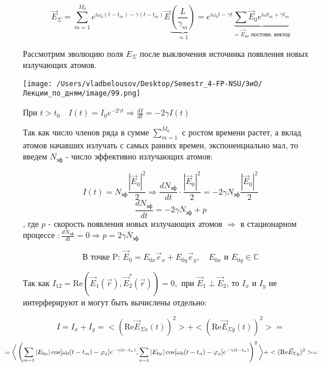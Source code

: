 \documentclass[12pt, a4paper]{report}
\begin{document}
\fi


\[ \vec{E }  _{\Sigma} = \sum_{m=1} ^{ M_0 } e^{i \omega_0 (t - t_m ) - \gamma (t - t_m ) }\vec{E }  \underbrace{\left( \frac{L}{\gamma_m }  \right)}_{\approx 1 } = e^{ i \omega_0 t - \gamma t } \underbrace{\sum \vec{E }  _0 e^{ i \omega t_m + \gamma t_m }}_{= \vec{E}  _{oo } \text{ постоян. вектор}  }     \]  



Рассмотрим эволюцию поля \( E_{\Sigma }  \) после выключения источника появления новых излучающих атомов. 

\begin{center}
    \texttt{[image: /Users/vladbelousov/Desktop/Semestr\_4-FP-NSU/ЭиО/Лекции\_по\_дням/image/99.png]}
\end{center} 
При \( \displaystyle t > t_0 \quad  I(t ) =I_0 e^{-2 \gamma t } \Rightarrow \frac{dI}{d t }  = - 2 \gamma I(t )  \) 

Так как число членов ряда в сумме \( \displaystyle  \sum_{m =1} ^{M_0}   \) с ростом времени растет, а вклад атомов начавших излучать с самых ранних времен, экспоненциально мал, то введем \( N_{\text{эф} }  \) - число эффективно излучающих атомов: 

\[ I(t) = N_{\text{эф} } \frac{|\vec{E } _0     | ^2 }{2 } \Rightarrow \frac{dN_{\text{эф} } }{dt }  \cdot \frac{ |\vec{E } _0| ^2 }{2 } = - 2 \gamma N_{\text{эф} } \frac{|\vec{E } _0  | ^2 }{2 }  \] 
\[ \frac{d N_{\text{эф} } }{dt } = - 2 \gamma N_{\text{эф} } + p  \] 
, где \( p \) - скорость появления новых излучающих атомов \( \Rightarrow  \)  в стационарном  процессе \(: \displaystyle  \frac{d N_{\text{эф} } }{dt } =0 \Rightarrow p = 2 \gamma \overline{N}_{\text{эф} }    \) 


\[ \text{В точке P: } \vec{E }  _0 = E_{0x }  \vec{e}_x + E_{0 y }  \vec{e }  _y , \quad  E_{0 x }  \text{ и } E_{0 y}  \in \mathbb{C}    \] 

Так как \( \displaystyle  I_{12} = \mathrm{Re }  (\vec{E }  _1 (\vec{r } ), \vec{E }  _2^* (\vec{r } )) = 0 , \text{ при } \vec{E }_1 \perp \vec{E } _2   \), то \( I_x \text{  и } I_y  \)  не интерферируют и могут быть вычислены отдельно: 

\[ I = I_x + I_y = <(\mathrm{Re}  \vec{E }  _{\Sigma x } (t )  ) ^2> + <(\mathrm{Re}  \vec{E }  _{\Sigma y } (t )  ) ^2 > = \] 
\[\kern-1cm =\bigg< \left( \sum_{m=1} |E_{0x} | \cos [\omega_0 (t - t_m ) - \varphi_x]e^{ - \gamma (t -t_n )},  \sum_{n=1} |E_{0x} | \cos [\omega_0 (t - t_n) - \varphi_x]e^{ - \gamma (t -t_n )}\right) ^2 \bigg> +<(\mathrm{Re }  \vec{E } _{\Sigma y} ) ^2  >=\] 
\end{document}
